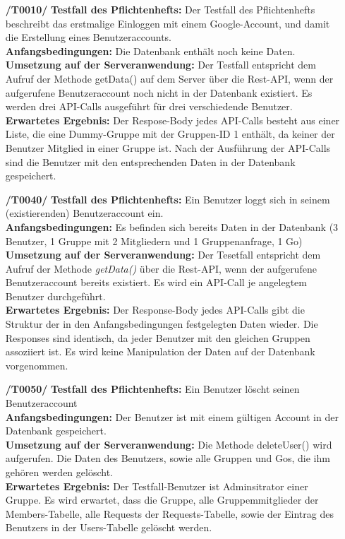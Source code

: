 \documentclass[11pt,a4paper]{scrartcl}
\begin{document}
\begin{enumerate}
	\item[\textbf{/T0010/}]
	\textbf{Testfall des Pflichtenhefts: }Der Testfall des Pflichtenhefts beschreibt das erstmalige Einloggen mit einem Google-Account, und damit die Erstellung eines Benutzeraccounts.\\
	\textbf{Anfangsbedingungen: }Die Datenbank enthält noch keine Daten.\\
	\textbf{Umsetzung auf der Serveranwendung: }Der Testfall entspricht dem Aufruf der Methode getData() auf dem Server über die Rest-API, wenn der aufgerufene Benutzeraccount noch nicht in der Datenbank existiert. Es werden drei API-Calls ausgeführt für drei verschiedende Benutzer.\\
	\textbf{Erwartetes Ergebnis: } Der Respose-Body jedes API-Calls besteht aus einer Liste, die eine Dummy-Gruppe mit der Gruppen-ID 1 enthält, da keiner der Benutzer Mitglied in einer Gruppe ist. Nach der Ausführung der API-Calls sind die Benutzer mit den entsprechenden Daten in der Datenbank gespeichert.
	
	\item[\textbf{/T0040/}]
	\textbf{Testfall des Pflichtenhefts: }Ein Benutzer loggt sich in seinem (existierenden) Benutzeraccount ein.\\
	\textbf{Anfangsbedingungen: }Es befinden sich bereits Daten in der Datenbank (3 Benutzer, 1 Gruppe mit 2 Mitgliedern und 1 Gruppenanfrage, 1 Go)\\
	\textbf{Umsetzung auf der Serveranwendung: }Der Tesetfall entspricht dem Aufruf der Methode \textit{getData()} über die Rest-API, wenn der aufgerufene Benutzeraccount bereits existiert. Es wird ein API-Call je angelegtem Benutzer durchgeführt.\\
	\textbf{Erwartetes Ergebnis: }Der Response-Body jedes API-Calls gibt die Struktur der in den Anfangsbedingungen festgelegten Daten wieder. Die Responses sind identisch, da jeder Benutzer mit den gleichen Gruppen assoziiert ist. Es wird keine Manipulation der Daten auf der Datenbank vorgenommen.
	
	\item[\textbf{/T0050/}]
	\textbf{Testfall des Pflichtenhefts: }Ein Benutzer löscht seinen Benutzeraccount\\
	\textbf{Anfangsbedingungen: }Der Benutzer ist mit einem gültigen Account in der Datenbank gespeichert.\\
	\textbf{Umsetzung auf der Serveranwendung: }Die Methode deleteUser() wird aufgerufen. Die Daten des Benutzers, sowie alle Gruppen und Gos, die ihm gehören werden gelöscht.\\
	\textbf{Erwartetes Ergebnis: }Der Testfall-Benutzer ist Adminsitrator einer Gruppe. Es wird erwartet, dass die Gruppe, alle Gruppemmitglieder der Members-Tabelle, alle Requests der Requests-Tabelle, sowie der Eintrag des Benutzers in der Users-Tabelle gelöscht werden.
	

\end{enumerate}
\end{document}
